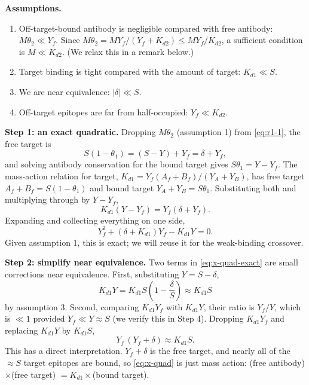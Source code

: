 \textbf{Assumptions.}
\begin{enumerate}
    \item Off-target-bound antibody is negligible compared with free
    antibody: $M\theta_2\ll Y_f$. Since
    $M\theta_2=MY_f/(Y_f+K_{d2})\le MY_f/K_{d2}$, a sufficient condition
    is $M\ll K_{d2}$. (We relax this in a remark below.)
    \item Target binding is tight compared with the amount of target:
    $K_{d1}\ll S$.
    \item We are near equivalence: $|\delta|\ll S$.
    \item Off-target epitopes are far from half-occupied: $Y_f\ll K_{d2}$.
\end{enumerate}

\textbf{Step 1: an exact quadratic.} Dropping $M\theta_2$ (assumption 1)
from \eqref{eq:r1-1}, the free target is
$$
S(1-\theta_1)=(S-Y)+Y_f=\delta+Y_f,
$$
and solving antibody conservation for the bound target gives
$S\theta_1=Y-Y_f$. The mass-action relation for target,
$K_{d1}=Y_f(A_f+B_f)/(Y_A+Y_B)$, has free target $A_f+B_f=S(1-\theta_1)$
and bound target $Y_A+Y_B=S\theta_1$. Substituting both and multiplying
through by $Y-Y_f$,
$$
K_{d1}(Y-Y_f)=Y_f(\delta+Y_f).
$$
Expanding and collecting everything on one side,
\begin{equation}
Y_f^2+(\delta+K_{d1})Y_f-K_{d1}Y=0.
\label{eq:x-quad-exact}
\end{equation}
Given assumption 1, this is exact; we will reuse it for the weak-binding
crossover.

\textbf{Step 2: simplify near equivalence.} Two terms in
\eqref{eq:x-quad-exact} are small corrections near equivalence. First,
substituting $Y=S-\delta$,
$$
K_{d1}Y=K_{d1}S\left(1-\frac{\delta}{S}\right)\approx K_{d1}S
$$
by assumption 3. Second, comparing $K_{d1}Y_f$ with $K_{d1}Y$, their ratio
is $Y_f/Y$, which is $\ll1$ provided $Y_f\ll Y\approx S$ (we verify this in
Step 4). Dropping $K_{d1}Y_f$ and replacing $K_{d1}Y$ by $K_{d1}S$,
\begin{equation}
Y_f\,(Y_f+\delta)\approx K_{d1}S.
\label{eq:x-quad}
\end{equation}
This has a direct interpretation. $Y_f+\delta$ is the free target, and
nearly all of the $\approx S$ target epitopes are bound, so
\eqref{eq:x-quad} is just mass action:
(free antibody)$\times$(free target) $=K_{d1}\times$(bound target).

